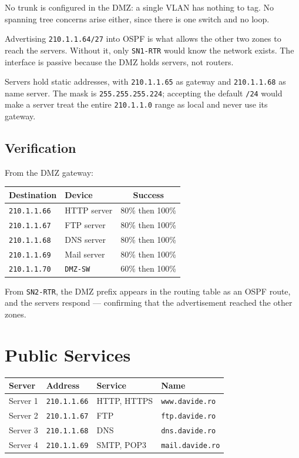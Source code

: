 \documentclass[12pt,a4paper]{article}
\begin{document}
No trunk is configured in the DMZ: a single VLAN has nothing to tag. No spanning
tree concerns arise either, since there is one switch and no loop.

Advertising \texttt{210.1.1.64/27} into OSPF is what allows the other two zones
to reach the servers. Without it, only \texttt{SN1-RTR} would know the network
exists. The interface is passive because the DMZ holds servers, not routers.

Servers hold static addresses, with \texttt{210.1.1.65} as gateway and
\texttt{210.1.1.68} as name server. The mask is \texttt{255.255.255.224};
accepting the default \texttt{/24} would make a server treat the entire
\texttt{210.1.1.0} range as local and never use its gateway.

\subsection{Verification}

From the DMZ gateway:

\begin{center}
\begin{tabular}{@{} l l c @{}}
\toprule
\textbf{Destination} & \textbf{Device} & \textbf{Success} \\
\midrule
\texttt{210.1.1.66} & HTTP server & 80\% then 100\% \\
\texttt{210.1.1.67} & FTP server  & 80\% then 100\% \\
\texttt{210.1.1.68} & DNS server  & 80\% then 100\% \\
\texttt{210.1.1.69} & Mail server & 80\% then 100\% \\
\texttt{210.1.1.70} & \texttt{DMZ-SW} & 60\% then 100\% \\
\bottomrule
\end{tabular}
\end{center}

From \texttt{SN2-RTR}, the DMZ prefix appears in the routing table as an OSPF
route, and the servers respond --- confirming that the advertisement reached the
other zones.

\section{Public Services}

\begin{table}[H]
\centering
\begin{tabular}{@{} l l l l @{}}
\toprule
\textbf{Server} & \textbf{Address} & \textbf{Service} & \textbf{Name} \\
\midrule
Server 1 & \texttt{210.1.1.66} & HTTP, HTTPS & \texttt{www.davide.ro} \\
Server 2 & \texttt{210.1.1.67} & FTP         & \texttt{ftp.davide.ro} \\
Server 3 & \texttt{210.1.1.68} & DNS         & \texttt{dns.davide.ro} \\
Server 4 & \texttt{210.1.1.69} & SMTP, POP3  & \texttt{mail.davide.ro} \\
\bottomrule
\end{tabular}
\end{table}
\end{document}
